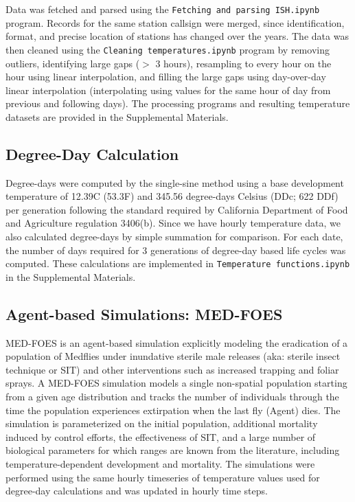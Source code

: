 \documentclass[10pt,a4paper,twocolumn]{article}
\begin{document}
Data was fetched and parsed using the \texttt{Fetching and parsing ISH.ipynb} program.
Records for the same station callsign were merged, since identification, format, 
and precise location of stations has changed over the years.
The data was then cleaned using the 
\texttt{Cleaning temperatures.ipynb} program by 
removing outliers, 
identifying large gaps ($>$ 3 hours), 
resampling to every hour on the hour using linear interpolation,
and filling the large gaps using day-over-day linear interpolation
(interpolating using values for the same hour of day from previous and following days).
The processing programs and resulting temperature datasets are 
provided in the Supplemental Materials.


\subsection*{Degree-Day Calculation}
Degree-days were computed by the single-sine method\cite{ECY:ECY1969503514}
using a base development temperature of 12.39\degree C (53.3\degree F) 
and 345.56 degree-days Celsius (DDc; 622 DDf) per generation 
following the standard required by California Department of Food and Agriculture
regulation 3406(b)\cite{CDFA_Medfly,3-CA-ADC-3406}.
Since we have hourly temperature data, we also calculated degree-days by simple summation
for comparison\cite{Roltsch1999}.
For each date, the number of days required for 3 generations of degree-day 
based life cycles was computed.
These calculations are implemented in \texttt{Temperature functions.ipynb} in the Supplemental Materials.


\subsection*{Agent-based Simulations: MED-FOES}

MED-FOES\cite{manoukis_computer_2014,manoukis_agent-based_2014} is 
an agent-based simulation explicitly modeling the eradication of a population of Medflies 
under inundative sterile male releases (aka: sterile insect technique or SIT) and other interventions
such as increased trapping and foliar sprays.
A MED-FOES simulation models a single non-spatial population starting from a given age distribution 
and tracks the number of individuals through the time the population experiences extirpation when the last 
fly (Agent) dies.
The simulation is parameterized on the initial population, additional mortality induced by control efforts,
the effectiveness of SIT, and a large number of biological parameters for which ranges are known from 
the literature, including temperature-dependent development and mortality.
The simulations were performed using the same hourly timeseries of temperature values 
used for degree-day calculations and was updated in hourly time steps.
\end{document}
